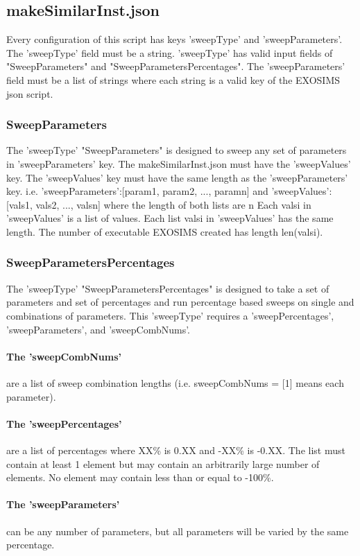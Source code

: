 \documentclass[12pt]{article}
\begin{document}
\subsection{makeSimilarInst.json}
Every configuration of this script has keys
'sweepType' and 'sweepParameters'.
The 'sweepType' field must be a string.
'sweepType' has valid input fields of "SweepParameters" and "SweepParametersPercentages".
The 'sweepParameters' field must be a list of strings where each string is a valid key of the EXOSIMS json script.

\subsubsection{SweepParameters}
The 'sweepType' "SweepParameters" is designed to sweep any set of parameters in 'sweepParameters' key.
The makeSimilarInst.json must have the 'sweepValues' key.
The 'sweepValues' key must have the same length as the 'sweepParameters' key.
i.e. 'sweepParameters':[param1, param2, ..., paramn] and 'sweepValues':[vals1, vals2, ..., valsn] where the length of both lists are n
Each valsi in 'sweepValues' is a list of values.
Each list valsi in 'sweepValues' has the same length.
The number of executable EXOSIMS created has length len(valsi).

\subsubsection{SweepParametersPercentages}
The 'sweepType' "SweepParametersPercentages" is designed to take a set of parameters and set of percentages and run percentage based sweeps on single and combinations of parameters.
This 'sweepType' requires a 'sweepPercentages', 'sweepParameters', and 'sweepCombNums'.

\paragraph{The 'sweepCombNums'} are a list of sweep combination lengths (i.e. sweepCombNums = [1] means each parameter).
\paragraph{The 'sweepPercentages'} are a list of percentages   where XX\% is 0.XX and -XX\% is -0.XX. 
The list must contain at least 1 element but may contain an arbitrarily large number of elements.
No element may contain less than or equal to -100\%.
\paragraph{The 'sweepParameters'} can be any number of parameters, but all parameters will be varied by the same percentage.
\end{document}
